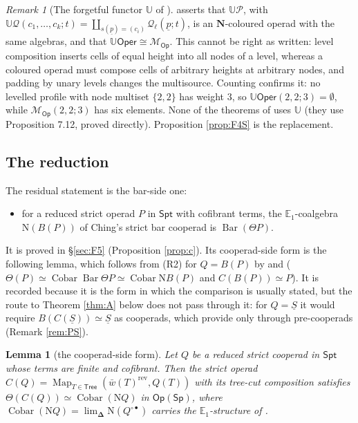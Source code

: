 \documentclass[11pt]{amsart}
\newtheorem{lemma}[subsection]{Lemma}
\theoremstyle{definition}
\theoremstyle{remark}
\newtheorem{remark}[subsection]{Remark}
\newcommand{\Spt}{\mathsf{Spt}}
\newcommand{\Sp}{\mathsf{Sp}}
\newcommand{\Map}{\operatorname{Map}}
\newcommand{\Oper}{\mathsf{Oper}}
\newcommand{\Op}{\mathsf{Op}}
\newcommand{\uS}{\underline{S}}
\newcommand{\BarC}{\operatorname{Bar}}
\newcommand{\Cobar}{\operatorname{Cobar}}
\newcommand{\Nfun}{\mathrm{N}}
\newcommand{\Th}{\Theta}
\begin{document}
\begin{remark}[The forgetful functor $\mathbb U$ of \cite{Cl1}]
\cite[\S 6.7]{Cl1} asserts that $\mathbb U\mathcal P$, with $\mathbb U\mathcal Q(c_1,\dots,c_k;t)=\coprod_{s(\underline p)=(c_i)}\mathcal Q_\ell(\underline p;t)$, is an $\mathbf N$-coloured operad with the same algebras, and \cite[Remark 7.13]{Cl1} that $\mathbb U\Oper\cong\mathcal M_{\mathsf{Op}}$. This cannot be right as written: level composition inserts cells of equal height into all nodes of a level, whereas a coloured operad must compose cells of arbitrary heights at arbitrary nodes, and padding by unary levels changes the multisource. Counting confirms it: no levelled profile with node multiset $\{2,2\}$ has weight $3$, so $\mathbb U\Oper(2,2;3)=\emptyset$, while $\mathcal M_{\mathsf{Op}}(2,2;3)$ has six elements. None of the theorems of \cite{Cl1} uses $\mathbb U$ (they use Proposition 7.12, proved directly). Proposition \ref{prop:F4S} is the replacement.
\end{remark}

\subsection{The reduction}\label{sec:reduction}
The residual statement is the bar-side one:
\begin{itemize}[leftmargin=2em]
\item[(R2)] for a reduced strict operad $P$ in $\Spt$ with cofibrant terms, the $\mathbb{E}_1$-coalgebra $\Nfun(B(P))$ of Ching's strict bar cooperad \cite[Corollary 7.16]{AC1} is $\BarC(\Th P)$.
\end{itemize}
It is proved in \S\ref{sec:F5} (Proposition \ref{prop:c}). Its cooperad-side form is the following lemma, which follows from (R2) for $Q=B(P)$ by \cite[Theorem 3.4]{HeKD} and \cite[Theorem 2.15]{Ch12} ($\Th(P)\simeq\Cobar\BarC\Th P\simeq\Cobar\Nfun B(P)$ and $C(B(P))\simeq P$). It is recorded because it is the form in which the comparison is usually stated, but the route to Theorem \ref{thm:A} below does not pass through it: for $Q=\uS$ it would require $B(C(\uS))\simeq\uS$ as cooperads, which \cite[Lemmas 3.18, 3.20]{Ch12} provide only through pre-cooperads (Remark \ref{rem:PS}).
\begin{lemma}[the cooperad-side form]\label{lem:F5}
Let $Q$ be a reduced strict cooperad in $\Spt$ whose terms are finite and cofibrant. Then the strict operad $C(Q)=\Map_{T\in\mathsf{Tree}}(\bar w(T)^{\mathrm{rev}},Q(T))$ with its tree-cut composition \cite[Definition 2.4]{Ch12} satisfies $\Th(C(Q))\simeq\Cobar(\Nfun Q)$ in $\Op(\Sp)$, where $\Cobar(\Nfun Q)=\lim_{\mathbf\Delta}\Nfun(Q^{\circ\bullet})$ carries the $\mathbb{E}_1$-structure of \cite[Theorem 5.2.2.17(3)]{HA}.
\end{lemma}
\end{document}
